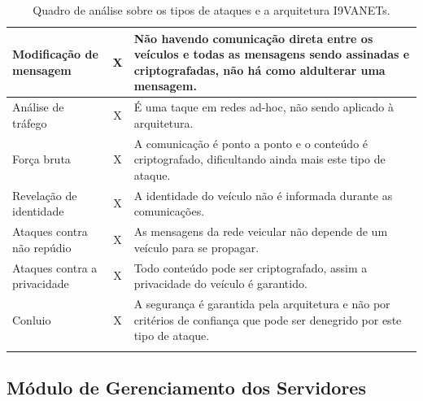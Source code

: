 \documentclass[
	12pt,				%
	oneside,			%
	a4paper,			%
	english,			%
	brazil				%
	]{abntex2ppgsi}
\begin{document}
\begin{longtable}{|l|c| p{}|}
		Modificação de mensagem	&  X  & Não havendo comunicação direta entre os veículos e todas as mensagens sendo assinadas e criptografadas, não há como aldulterar uma mensagem. \\ \hline
		Análise de tráfego	&  X & É uma taque em redes ad-hoc, não sendo aplicado à arquitetura. \\ \hline
		Força bruta	&  X & A comunicação é ponto a ponto e o conteúdo é criptografado, dificultando ainda mais este tipo de ataque.\\ \hline
		Revelação de identidade	&  X & A identidade do veículo não é informada durante as comunicações.\\ \hline
		Ataques contra não repúdio	&  X & As mensagens da rede veicular não depende de um veículo para se propagar. \\ \hline
		Ataques contra a privacidade &  X & Todo conteúdo pode ser criptografado, assim a privacidade do veículo é garantido. \\ \hline
		Conluio	&  X & A segurança é garantida pela arquitetura e não por critérios de confiança que pode ser denegrido por este tipo de ataque. \\ \hline
	\caption{Quadro de análise sobre os tipos de ataques e a arquitetura I9VANETs.} 
	\label{tab:I9VanetSeguranca}
\end{longtable}

\subsection{Módulo de Gerenciamento dos Servidores}

\end{document}
